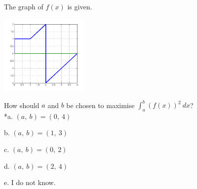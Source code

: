 
The graph of \(f(x)\) is given.

\includegraphics[width=1.71005in,height=1.52489in]{../../Images/IntegralCalculusQ1234.png}

How should \(a\) and \(b\) be chosen to maximise \( \int_a^b ( f ( x ) )^{2} \ dx \)?\\


*a. \( ( a,\ b  ) = ( 0,\ 4 )\)

b. \(( a,\ b ) = ( 1,\ 3 ) \)

c. \( ( a,\ b ) = (0,\ 2) \)

d. \( ( a,\ b ) = (2,\ 4)\)

e. I do not know.\\
